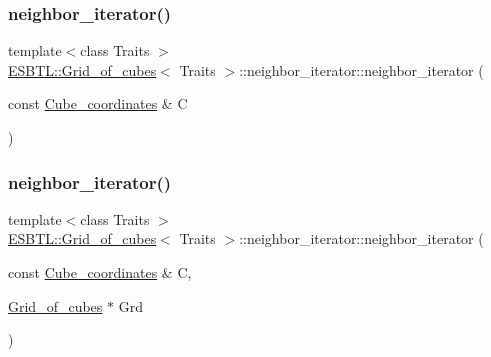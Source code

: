 \subsubsection{\texorpdfstring{neighbor\+\_\+iterator()}{neighbor\_iterator()}\hspace{0.1cm}{\footnotesize\ttfamily [2/3]}}
{\footnotesize\ttfamily template$<$class Traits $>$ \\
\hyperlink{structESBTL_1_1Grid__of__cubes}{E\+S\+B\+T\+L\+::\+Grid\+\_\+of\+\_\+cubes}$<$ Traits $>$\+::neighbor\+\_\+iterator\+::neighbor\+\_\+iterator (\begin{DoxyParamCaption}\item[{const \hyperlink{structESBTL_1_1Grid__of__cubes_ad55c84346bab961e08d95e494551d07d}{Cube\+\_\+coordinates} \&}]{C }\end{DoxyParamCaption})\hspace{0.3cm}{\ttfamily [inline]}}

\mbox{\label{classESBTL_1_1Grid__of__cubes_1_1neighbor__iterator_a6eaaee1feeb226221cb5711ea6242102}} 
\subsubsection{\texorpdfstring{neighbor\+\_\+iterator()}{neighbor\_iterator()}\hspace{0.1cm}{\footnotesize\ttfamily [3/3]}}
{\footnotesize\ttfamily template$<$class Traits $>$ \\
\hyperlink{structESBTL_1_1Grid__of__cubes}{E\+S\+B\+T\+L\+::\+Grid\+\_\+of\+\_\+cubes}$<$ Traits $>$\+::neighbor\+\_\+iterator\+::neighbor\+\_\+iterator (\begin{DoxyParamCaption}\item[{const \hyperlink{structESBTL_1_1Grid__of__cubes_ad55c84346bab961e08d95e494551d07d}{Cube\+\_\+coordinates} \&}]{C,  }\item[{\hyperlink{structESBTL_1_1Grid__of__cubes}{Grid\+\_\+of\+\_\+cubes} $\ast$}]{Grd }\end{DoxyParamCaption})\hspace{0.3cm}{\ttfamily [inline]}}



